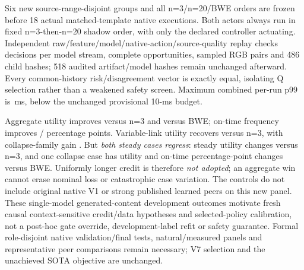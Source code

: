 \documentclass[10pt]{article}
\begin{document}
Six new source-range-disjoint groups and all n=3/n=20/BWE orders are frozen before 18 actual matched-template native executions. Both actors always run in fixed n=3-then-n=20 shadow order, with only the declared controller actuating. Independent raw/feature/model/native-action/source-quality replay checks \NativeTemporalDecisions{} decisions per model stream, \NativeTemporalRequests{} complete opportunities, \NativeTemporalPairs{} sampled RGB pairs and 486 child hashes; 518 audited artifact/model hashes remain unchanged afterward. Every common-history risk/disagreement vector is exactly equal, isolating Q selection rather than a weakened safety screen. Maximum combined per-run p99 is \NativeTemporalTail{}\,ms, below the unchanged provisional 10-ms budget.
\begin{table}[ht]
\centering
\caption{Single-model actual native temporal-credit development means: same fitting data, actor recipe and risk/Platt/screens, only return horizon differs. New source templates do not provide identical packet trajectories, natural-content generalization, significance or native promotion evidence.}
\label{tab:native-temporal-v4}
\end{table}
\begin{table}[ht]
\centering\resizebox{\textwidth}{!}{}
\caption{All family trade-offs of n=20 minus unchanged n=3 and BWE, two actual source groups per family. Positive/negative values favor/harm the long-return candidate; no unfavorable case is discarded.}
\label{tab:native-temporal-v4-groups}
\end{table}
Aggregate utility improves \NativeTemporalBaseUtility{} versus n=3 and \NativeTemporalBweUtility{} versus BWE; on-time frequency improves \NativeTemporalBaseOntime{} / \NativeTemporalBweOntime{} percentage points. Variable-link utility recovers \NativeTemporalVariableBaseUtility{} versus n=3, with collapse-family gain \NativeTemporalCollapseBaseUtility{}. But \emph{both steady cases regress}: steady utility changes \NativeTemporalStableBaseUtility{} versus n=3, and one collapse case has \NativeTemporalWorstBweUtility{} utility and \NativeTemporalWorstBweOntime{} on-time percentage-point changes versus BWE. Uniformly longer credit is therefore \emph{not adopted}; an aggregate win cannot erase nominal loss or catastrophic case variation. The controls do not include original native V1 or strong published learned peers on this new panel. These single-model generated-content development outcomes motivate fresh causal context-sensitive credit/data hypotheses and selected-policy calibration, not a post-hoc gate override, development-label refit or safety guarantee. Formal role-disjoint native validation/final tests, natural/measured panels and representative peer comparisons remain necessary; V7 selection and the unachieved SOTA objective are unchanged.
\end{document}
